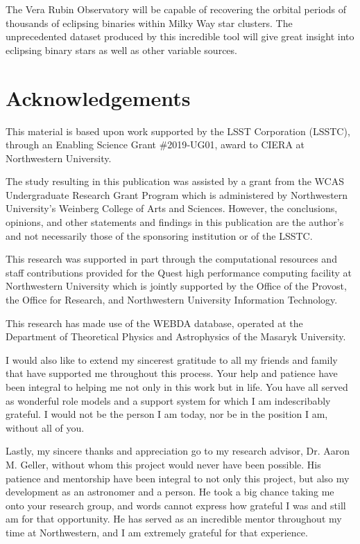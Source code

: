 \documentclass[twocolumn]{aastex63}
\begin{document}
The Vera Rubin Observatory will be capable of recovering the orbital periods of thousands of eclipsing binaries within Milky Way star clusters. The unprecedented dataset produced by this incredible tool will give great insight into eclipsing binary stars as well as other variable sources.


\section{Acknowledgements}
This material is based upon work supported by the LSST Corporation (LSSTC), through an Enabling Science Grant \#2019‐UG01, award to CIERA at Northwestern University.

The study resulting in this publication was assisted by a grant from the WCAS Undergraduate Research Grant Program which is administered by Northwestern University's Weinberg College of Arts and Sciences. However, the conclusions, opinions, and other statements and findings in this publication are the author's and not necessarily those of the sponsoring institution or of the LSSTC.

This research was supported in part through the computational resources and staff contributions provided for the Quest high performance computing facility at Northwestern University which is jointly supported by the Office of the Provost, the Office for Research, and Northwestern University Information Technology.

This research has made use of the WEBDA database, operated at the Department of Theoretical Physics and Astrophysics of the Masaryk University. 

I would also like to extend my sincerest gratitude to all my friends and family that have supported me throughout this process. Your help and patience have been integral to helping me not only in this work but in life. You have all served as wonderful role models and a support system for which I am indescribably grateful. I would not be the person I am today, nor be in the position I am, without all of you.

Lastly, my sincere thanks and appreciation go to my research advisor, Dr. Aaron M. Geller, without whom this project would never have been possible. His patience and mentorship have been integral to not only this project, but also my development as an astronomer and a person. He took a big chance taking me onto your research group, and words cannot express how grateful I was and still am for that opportunity. He has served as an incredible mentor throughout my time at Northwestern, and I am extremely grateful for that experience.
\end{document}
